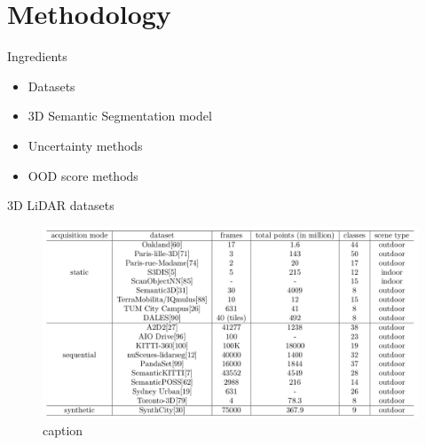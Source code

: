 \documentclass[aspectratio=169]{beamer}
\begin{document}
\section{Methodology}
\begin{frame}[noframenumbering]{Ingredients}
    \begin{itemize}
        \item Datasets
        \item 3D Semantic Segmentation model
        \item Uncertainty methods
        \item OOD score methods
    \end{itemize}
\end{frame}
\begin{frame}{3D LiDAR datasets}
    \begin{figure}
        \centering
        \includegraphics[scale=0.25]{images/3d_datasets.jpg}
        \caption{caption}
        \label{fig:datasets}
    \end{figure}
\end{frame}
\end{document}
